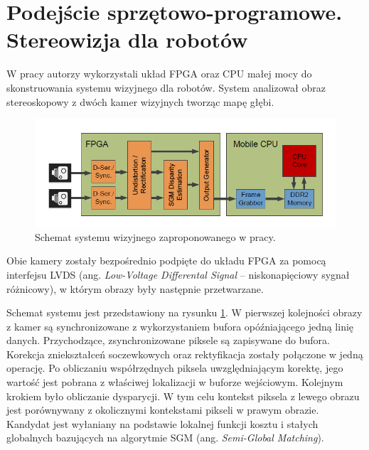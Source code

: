 
\section{Podejście sprzętowo-programowe. Stereowizja dla robotów }

W pracy \cite{honegger2014real} autorzy wykorzystali układ FPGA oraz CPU małej mocy do skonstruowania systemu wizyjnego dla robotów.
System analizował obraz stereoskopowy z dwóch kamer wizyjnych tworząc mapę głębi.
\begin{figure}[h]
\centering
\includegraphics[width=1\textwidth]{images/honegger2014real_Fig1}
\caption{Schemat systemu wizyjnego zaproponowanego w pracy\cite{honegger2014real}.}
\label{fig:honegger2014real_Fig1}
\end{figure}
Obie kamery zostały bezpośrednio podpięte do układu FPGA za pomocą interfejsu LVDS (ang. \textit{Low-Voltage Differental Signal} – niskonapięciowy sygnał różnicowy), w którym obrazy były następnie przetwarzane.


Schemat systemu jest przedstawiony na rysunku \ref{fig:honegger2014real_Fig1}. W pierwszej kolejności obrazy z kamer są synchronizowane z wykorzystaniem bufora opóźniającego jedną linię danych.
Przychodzące, zsynchronizowane piksele są zapisywane do bufora. Korekcja zniekształceń soczewkowych oraz rektyfikacja zostały połączone w jedną operację. Po obliczaniu współrzędnych piksela uwzględniającym korektę, jego wartość jest pobrana z właściwej lokalizacji w buforze wejściowym. Kolejnym krokiem było obliczanie dysparycji. W tym celu kontekst piksela z lewego obrazu jest porównywany z okolicznymi kontekstami pikseli w prawym obrazie. Kandydat jest wyłaniany na podstawie lokalnej funkcji kosztu i stałych globalnych bazujących na algorytmie SGM (ang. \textit{Semi-Global Matching}).

